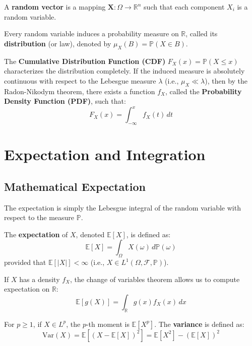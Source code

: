 \documentclass[oneside]{book}
\begin{document}
\begin{definition}
A \textbf{random vector} is a mapping $\mathbf{X}: \Omega \to \mathbb{R}^n$ such that each component $X_i$ is a random variable.
\end{definition}

Every random variable induces a probability measure on $\mathbb{R}$, called its \textbf{distribution} (or law), denoted by $\mu_X(B) = \mathbb{P}(X \in B)$.

\begin{definition}
The \textbf{Cumulative Distribution Function (CDF)} $F_X(x) = \mathbb{P}(X \le x)$ characterizes the distribution completely.
If the induced measure is absolutely continuous with respect to the Lebesgue measure $\lambda$ (i.e., $\mu_X \ll \lambda$), then by the Radon-Nikodym theorem, there exists a function $f_X$, called the \textbf{Probability Density Function (PDF)}, such that:
\[ F_X(x) = \int_{-\infty}^x f_X(t) \, dt \]
\end{definition}

\section{Expectation and Integration}

\subsection{Mathematical Expectation}

The expectation is simply the Lebesgue integral of the random variable with respect to the measure $\mathbb{P}$.

\begin{definition}[Expectation]
The \textbf{expectation} of $X$, denoted $\mathbb{E}[X]$, is defined as:
\[ \mathbb{E}[X] = \int_\Omega X(\omega) \, d\mathbb{P}(\omega) \]
provided that $\mathbb{E}[|X|] < \infty$ (i.e., $X \in L^1(\Omega, \mathcal{F}, \mathbb{P})$).
\end{definition}

If $X$ has a density $f_X$, the change of variables theorem allows us to compute expectation on $\mathbb{R}$:
\[ \mathbb{E}[g(X)] = \int_{\mathbb{R}} g(x) f_X(x) \, dx \]

\begin{definition}
For $p \ge 1$, if $X \in L^p$, the $p$-th moment is $\mathbb{E}[X^p]$.
The \textbf{variance} is defined as:
\[ \text{Var}(X) = \mathbb{E}[(X - \mathbb{E}[X])^2] = \mathbb{E}[X^2] - (\mathbb{E}[X])^2 \]
\end{definition}
\end{document}
